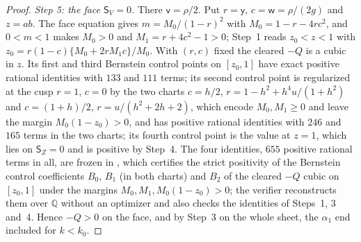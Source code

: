 \documentclass[11pt]{article}
\theoremstyle{remark}
\begin{document}
\begin{proof}
\emph{Step 5: the face $\mathsf S_V=0$.}  There $\mathsf v=\rho/2$.  Put
$r=\mathsf y$, $c=\mathsf w=\rho/(2g)$ and $z=ab$.  The face equation gives
$m=M_0/(1-r)^2$ with $M_0=1-r-4rc^2$, and $0<m<1$ makes $M_0>0$ and
$M_1=r+4c^2-1>0$; Step~1 reads
$z_0<z<1$ with $z_0=r(1-c)\{M_0+2rM_1c\}/M_0$.  With $(r,c)$ fixed the
cleared $-Q$ is a cubic in $z$.  Its first and third Bernstein control
points on $[z_0,1]$ have exact positive rational identities with $133$ and
$111$ terms; its second control point is regularized at the cusp
$r=1$, $c=0$ by the two charts $c=h/2$, $r=1-h^2+h^4u/(1+h^2)$ and
$c=(1+h)/2$, $r=u/(h^2+2h+2)$, which encode $M_0,M_1\ge0$ and leave the
margin $M_0(1-z_0)>0$, and has positive rational identities with $246$
and $165$ terms in the two charts; its fourth control point is the value
at $z=1$, which lies on $\mathsf S_Z=0$ and is positive by Step~4.  The
four identities, $655$ positive rational terms in all, are frozen in
, which certifies the
strict positivity of the Bernstein control coefficients $B_0$, $B_1$ (in
both charts) and $B_2$ of the cleared $-Q$ cubic on $[z_0,1]$ under the
margins $M_0,M_1,M_0(1-z_0)>0$; the verifier
 reconstructs them over
$\mathbb Q$ without an optimizer and also checks the identities of
Steps~1, 3 and~4.  Hence $-Q>0$ on the face, and by Step~3 on the whole
sheet, the $\alpha_1$ end included for $k<k_0$.
\end{proof}



\end{document}
